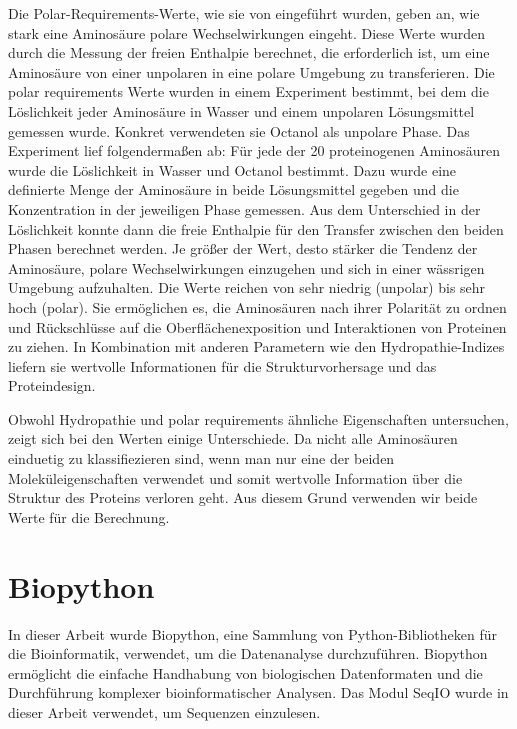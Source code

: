 \documentclass[german,version-2022-01]{uzl-thesis}
\begin{document}
Die Polar-Requirements-Werte, wie sie von \citeauthor{woese_fundamental_1966} eingef\"uhrt wurden, geben an, wie stark eine Aminos\"aure polare Wechselwirkungen eingeht. Diese Werte wurden durch die Messung der freien Enthalpie berechnet, die erforderlich ist, um eine Aminos\"aure von einer unpolaren in eine polare Umgebung zu transferieren. Die polar requirements Werte wurden in einem Experiment bestimmt, bei dem die L\"oslichkeit jeder Aminos\"aure in Wasser und einem unpolaren L\"osungsmittel gemessen wurde. Konkret verwendeten sie Octanol als unpolare Phase. Das Experiment lief folgenderma\ss{}en ab: F\"ur jede der 20 proteinogenen Aminos\"auren wurde die L\"oslichkeit in Wasser und Octanol bestimmt. Dazu wurde eine definierte Menge der Aminos\"aure in beide L\"osungsmittel gegeben und die Konzentration in der jeweiligen Phase gemessen. Aus dem Unterschied in der L\"oslichkeit konnte dann die freie Enthalpie f\"ur den Transfer zwischen den beiden Phasen berechnet werden. Je gr\"o\ss{}er der Wert, desto st\"arker die Tendenz der Aminos\"aure, polare Wechselwirkungen einzugehen und sich in einer w\"assrigen Umgebung aufzuhalten. Die Werte reichen von sehr niedrig (unpolar) bis sehr hoch (polar). Sie erm\"oglichen es, die Aminos\"auren nach ihrer Polarit\"at zu ordnen und R\"uckschl\"usse auf die Oberfl\"achenexposition und Interaktionen von Proteinen zu ziehen. In Kombination mit anderen Parametern wie den Hydropathie-Indizes liefern sie wertvolle Informationen f\"ur die Strukturvorhersage und das Proteindesign.

Obwohl Hydropathie und polar requirements \"ahnliche Eigenschaften untersuchen, zeigt sich bei den Werten einige Unterschiede. Da nicht alle Aminos\"auren einduetig zu klassifiezieren sind, wenn man nur eine der beiden Molek\"uleigenschaften verwendet und somit wertvolle Information \"uber die Struktur des Proteins verloren geht. Aus diesem Grund verwenden wir beide Werte f\"ur die Berechnung. 

\section{Biopython}
In dieser Arbeit wurde Biopython, eine Sammlung von Python-Bibliotheken f\"ur die Bioinformatik, verwendet, um die Datenanalyse durchzuf\"uhren. Biopython erm\"oglicht die einfache Handhabung von biologischen Datenformaten und die Durchf\"uhrung komplexer bioinformatischer Analysen. Das Modul SeqIO wurde in dieser Arbeit verwendet, um Sequenzen einzulesen. 
\end{document}

